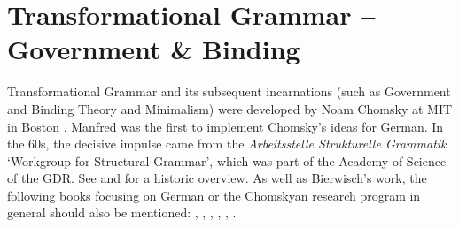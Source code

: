 

\chapter{Transformational Grammar -- Government \& Binding}
\label{Kapitel-GB}\label{chap-GB}\label{chap-gb}

Transformational Grammar and its subsequent incarnations (such as Government and Binding Theory
and Minimalism) were developed by Noam Chomsky at MIT in Boston \citep{Chomsky57a,Chomsky65a,Chomsky75a,Chomsky81a,Chomsky86b,Chomsky95a-u}.
Manfred \citet{Bierwisch63} was the first to implement Chomsky's ideas for German. In the 60s, the decisive impulse came from the 
\emph{Arbeitsstelle Strukturelle Grammatik} `Workgroup for Structural Grammar', which was part of the Academy of Science of the GDR. See
\citealp{Bierwisch92} and \citealp{Vater2010a} for a historic overview.
As well as Bierwisch's work, the following books focusing on German or the Chomskyan research
program in general should also be mentioned: , , ,
, , .

